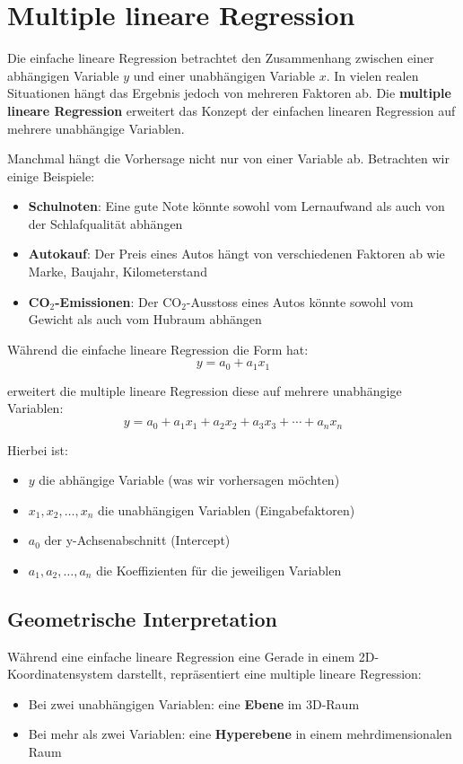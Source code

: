\section{Multiple lineare Regression}

Die einfache lineare Regression betrachtet den Zusammenhang zwischen einer abhängigen Variable $y$ und einer unabhängigen Variable $x$. In vielen realen Situationen hängt das Ergebnis jedoch von mehreren Faktoren ab. Die \textbf{multiple lineare Regression} erweitert das Konzept der einfachen linearen Regression auf mehrere unabhängige Variablen.

Manchmal hängt die Vorhersage nicht nur von einer Variable ab. Betrachten wir einige Beispiele:

\begin{itemize}
	\item \textbf{Schulnoten}: Eine gute Note könnte sowohl vom Lernaufwand als auch von der Schlafqualität abhängen
	\item \textbf{Autokauf}: Der Preis eines Autos hängt von verschiedenen Faktoren ab wie Marke, Baujahr, Kilometerstand
	\item \textbf{CO$_2$-Emissionen}: Der CO$_2$-Ausstoss eines Autos könnte sowohl vom Gewicht als auch vom Hubraum abhängen
\end{itemize}

Während die einfache lineare Regression die Form hat:
\[y = a_0 + a_1 x_1\]

erweitert die multiple lineare Regression diese auf mehrere unabhängige Variablen:
\[y = a_0 + a_1 x_1 + a_2 x_2 + a_3 x_3 + \cdots + a_n x_n\]

Hierbei ist:
\begin{itemize}
	\item $y$ die abhängige Variable (was wir vorhersagen möchten)
	\item $x_1, x_2, \ldots, x_n$ die unabhängigen Variablen (Eingabefaktoren)
	\item $a_0$ der y-Achsenabschnitt (Intercept)
	\item $a_1, a_2, \ldots, a_n$ die Koeffizienten für die jeweiligen Variablen
\end{itemize}

\subsection{Geometrische Interpretation}

Während eine einfache lineare Regression eine Gerade in einem 2D-Koordinatensystem darstellt, repräsentiert eine multiple lineare Regression:
\begin{itemize}
	\item Bei zwei unabhängigen Variablen: eine \textbf{Ebene} im 3D-Raum
	\item Bei mehr als zwei Variablen: eine \textbf{Hyperebene} in einem mehrdimensionalen Raum
\end{itemize}

